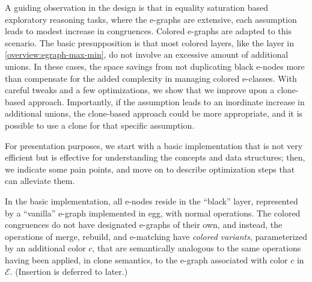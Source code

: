 A guiding observation in the design is that in equality saturation based exploratory reasoning tasks, where the e-graphs are extensive, each assumption leads to modest increase in congruences.
Colored e-graphs are adapted to this scenario.
The basic presupposition is that most colored layers, like the \cblue layer in \autoref{overview:egraph-max-min}, do not involve an excessive amount of additional unions.
In these cases, the space savings from not duplicating black e-nodes more than compensate for the added complexity in managing colored e-classes. 
With careful tweaks and a few optimizations, we show that we improve upon a clone-based approach.
Importantly, if the assumption leads to an inordinate increase in additional unions, the clone-based approach could be more appropriate, and it is possible to use a clone for that specific assumption.

For presentation purposes, we start with a basic implementation that is not very efficient but is effective for understanding the concepts and data structures;
then, we indicate some pain points, and move on to describe optimization steps that can alleviate them.

In the basic implementation, all e-nodes reside in the ``black'' layer,  represented by a ``vanilla'' e-graph implemented in egg, with normal operations.
The colored congruences do not have designated e-graphs of their own, and instead, the operations of merge, rebuild, and e-matching have \emph{colored variants}, parameterized by an additional color $c$, that are semantically analogous to the same operations having been applied, in clone semantics, to the e-graph associated with color $c$ in $\mathcal{E}$.
(Insertion is deferred to later.)

